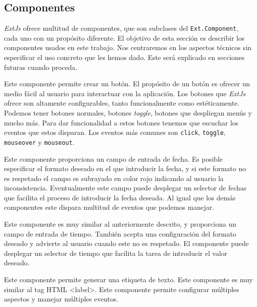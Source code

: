 	\subsection{Componentes}  %
		\emph{ExtJs} ofrece multitud de componentes, que son subclases del \texttt{Ext.Component}, cada uno con un propósito diferente. El objetivo
		de esta sección es describir los componentes usados en este trabajo. Nos centraremos en los aspectos técnicos sin especificar el uso
		concreto que les hemos dado. Este será explicado en secciones futuras cuando proceda. 
		\begin{description}[style=unboxed,leftmargin=0cm]
			\item[\texttt{Ext.button.Button xtype:button}] Este componente permite crear un botón. El propósito de un botón es ofrecer un
			  medio fácil al usuario para interactuar con la aplicación. Los botones que \emph{ExtJs} ofrece son altamente configurables, tanto
			  funcionalmente como estéticamente. Podemos tener botones normales, botones \emph{toggle}, botones que despliegan menús y
			  mucho más. Para dar funcionalidad a estos botones tenemos que escuchar los eventos que estos disparan. Los eventos más
			  comunes son \texttt{click}, \texttt{toggle}, \texttt{mouseover} y \texttt{mouseout}.
			\item[\texttt{Ext.form.field.Date xtype:datefield}] Este componente proporciona un campo de entrada de fecha. Es posible
			  especificar el formato deseado en el que introducir la fecha, y si este formato no es respetado el campo es subrayado en
			  color rojo indicando al usuario la inconsistencia. Eventualmente este campo puede desplegar un selector de fechas que
			  facilita el proceso de introducir la fecha deseada. Al igual que los demás componentes este dispara multitud de eventos que
			  podemos manejar.
			\item[\texttt{Ext.form.field.Time xtype:timefield}] Este componente es muy similar al anteriormente descrito, y proporciona
			  un campo de entrada de tiempo. También acepta una configuración del formato deseado y advierte  al usuario cuando este no es
			  respetado. El componente puede desplegar un selector de tiempo que facilita la tarea de introducir el valor deseado.
			\item[\texttt{Ext.form.Label xtype:label}] Este componente permite generar una etiqueta de texto. Este componente es muy
			  similar al tag HTML <label>. Este componente permite configurar múltiples aspectos y manejar múltiples eventos.

\end{description}

